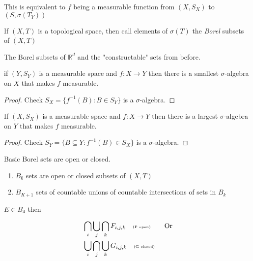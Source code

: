 \begin{theorem}
	This is equivalent to $f$ being a measurable function from $(X, S_X)$ to $(S, \sigma(T_Y))$
\end{theorem}

\begin{example}
	If $(X,T)$ is a topological space, then call elements of $\sigma(T)$ the \emph{Borel} subsets of $(X,T)$	
\end{example}

The Borel subsets of $\mathbb{R}^d$ and the "constructable" sets from before.

\begin{theorem}
	if $(Y, S_Y)$ is a measurable space and $f: X \to Y$ then there is a smallest $\sigma$-algebra on $X$ that makes $f$ measurable.
\end{theorem}
\begin{proof}
	Check $S_X = \{f^{-1}(B) : B \in S_Y\}$ is a $\sigma$-algebra.
\end{proof}

\begin{theorem}
	If $(X, S_X)$ is a measurable space and $f:X \to Y$ then there is a largest $\sigma$-algebra on $Y$ that makes $f$ measurable.
\end{theorem}

\begin{proof}
	Check $S_Y = \{B \subseteq Y: f^{-1}(B) \in S_X \}$ is a $\sigma$-algebra.
\end{proof}

\begin{definition}
	Basic Borel sets are open or closed.
	\begin{enumerate}
		\item $B_0$ sets are open or closed subsets of $(X,T)$
		\item $B_{K+1}$ sets of countable unions of countable intersections of sets in $B_k$
	\end{enumerate}
\end{definition}

\begin{example}
	$E \in B_4$ then

	 \begin{align*}
		 &\bigcap_i \bigcup_j \bigcap_k F_{i,j,k} \quad \text{\tiny (F open)} \qquad \text{Or} \\
		 &\bigcup_i \bigcap_j \bigcup_k G_{i,j,k} \quad \text{\tiny (G closed)}
	\end{align*}
	
\end{example}

